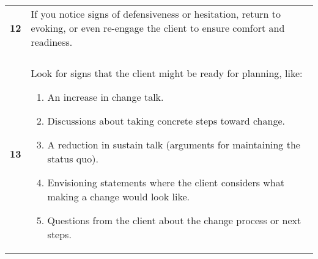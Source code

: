 \begin{tcolorbox}[breakable,
		fonttitle=\bfseries,
		fontupper=\small,
		title=Final \sysname Prompt]
\begin{tabularx}{\linewidth}{r X}
		\textbf{12} & If you notice signs of defensiveness or hesitation, return to evoking, or even re-engage the client to ensure comfort and readiness.                                                                                                                                                                                                                                                                  \\

		            &                                                                                                                                                                                                                                                                                                                                                                                                       \\[-12pt]

		\textbf{13} & Look for signs that the client might be ready for planning, like:
		\begin{enumerate}[itemsep=0pt, parsep=0pt]
			\item An increase in change talk.
			\item Discussions about taking concrete steps toward change.
			\item A reduction in sustain talk (arguments for maintaining the status quo).
			\item Envisioning statements where the client considers what making a change would look like.
			\item Questions from the client about the change process or next steps.
		\end{enumerate}

		\vspace{-16pt}
	\end{tabularx}
	\vspace{-16pt}

\end{tcolorbox}



\clearpage





